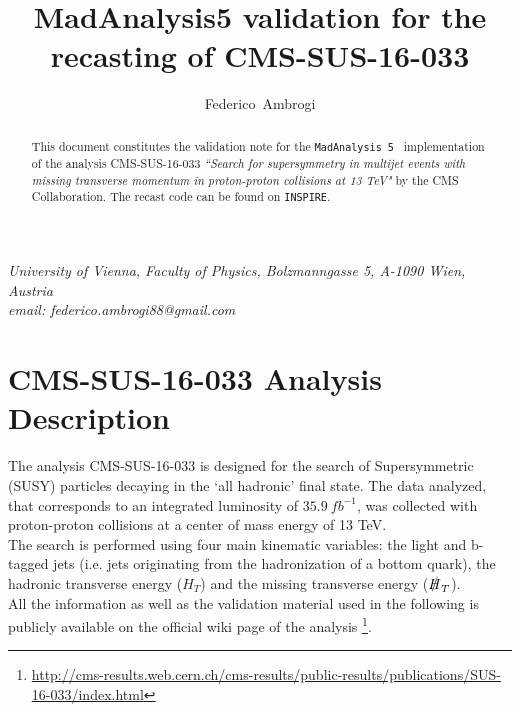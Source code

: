 \documentclass[12pt,A4paper
english, %
singlespacing, %
parskip, %
headsepline, %
]{article}
\newcommand{\MAD}{\texttt{MadAnalysis 5}}
\begin{document}
\hypersetup{%
  colorlinks = true,
  linkcolor  = blue
}


\title{MadAnalysis5 validation for the recasting of CMS-SUS-16-033}
\author{Federico~Ambrogi}

\renewcommand{\thefootnote}{\arabic{footnote}}

\maketitle
{\it University of Vienna, Faculty of Physics, Bolzmanngasse 5, A-1090 Wien, Austria 
\\

email: federico.ambrogi88@gmail.com\\[2mm]
}

\begin{abstract}
This document constitutes the validation note for the \MAD~\cite{Conte:2012fm,Conte:2014zja,Dumont:2014tja} implementation of the analysis CMS-SUS-16-033 \cite{Sirunyan:2017cwe} \textit{``Search for supersymmetry in multijet events with missing transverse momentum in proton-proton collisions at 13 TeV"} by the CMS Collaboration. The recast code can be found on \texttt{INSPIRE}\cite{code}.
\end{abstract}

\tableofcontents

\clearpage
\section{CMS-SUS-16-033 Analysis Description}
The analysis CMS-SUS-16-033\cite{Sirunyan:2017cwe} is designed for the search of Supersymmetric (SUSY) particles decaying in the `all hadronic' final state. The data analyzed, that corresponds to an integrated luminosity of $35.9 \ fb^{-1}$, was collected with proton-proton collisions at a center of mass energy of 13 TeV. 
\\

The search is performed using four main kinematic variables: the light and b-tagged jets (i.e. jets originating from the hadronization of a bottom quark), the hadronic transverse energy ($H_T$) and the missing transverse energy ($\slashed {H}_T$). 
\\

All the information as well as the validation material used in the following is publicly available on the official wiki page of the analysis \footnote{\url{http://cms-results.web.cern.ch/cms-results/public-results/publications/SUS-16-033/index.html}}. 
\end{document}
